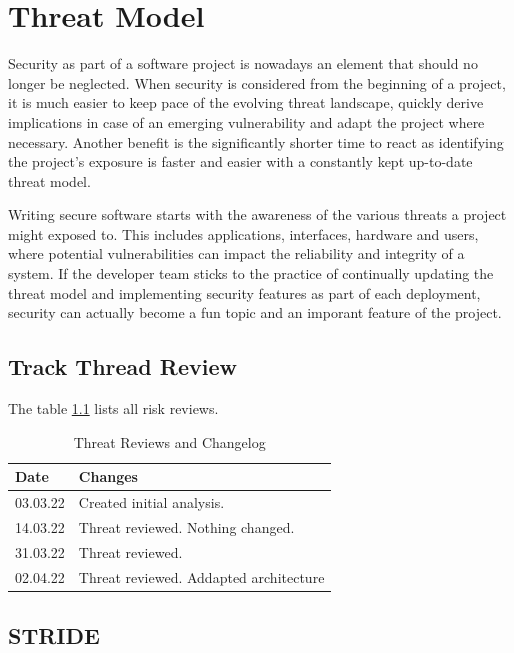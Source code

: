 \chapter{Threat Model}

Security as part of a software project is nowadays an element that should no longer be neglected. When security is considered from the beginning of a project, it is much easier to keep pace of the evolving threat landscape, quickly derive implications in case of an emerging vulnerability and adapt the project where necessary. Another benefit is the significantly shorter time to react as identifying the project's exposure is faster and easier with a constantly kept up-to-date threat model.

Writing secure software starts with the awareness of the various threats a project might exposed to. This includes applications, interfaces, hardware and users, where potential vulnerabilities can impact the reliability and integrity of a system. If the developer team sticks to the practice of continually updating the threat model and implementing security features as part of each deployment, security can actually become a fun topic and an imporant feature of the project.

\section{Track Thread Review}
The table \ref{tab:threat-review} lists all risk reviews.

\begin{table}[h!]
  \centering
  \caption{\label{tab:threat-review}Threat Reviews and Changelog}
  \begin{tabular}{ | l | l | }
    \hline
    \textbf{Date} & \textbf{Changes} \\
    \hline
    03.03.22 & Created initial analysis. \\
    \hline
    14.03.22 & Threat reviewed. Nothing changed. \\
    \hline
    31.03.22 & Threat reviewed. \\
    \hline
    02.04.22 & Threat reviewed. Addapted architecture \\
    \hline
  \end{tabular}
\end{table}

\section{STRIDE}

